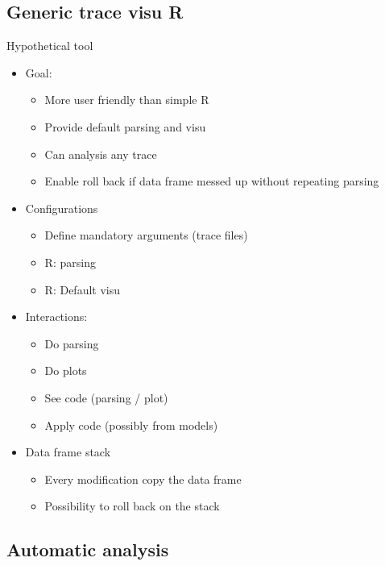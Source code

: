 \subsection{Generic trace visu R}

Hypothetical tool
\begin{itemize}
    \item Goal:
        \begin{itemize}
            \item More user friendly than simple R
            \item Provide default parsing and visu
            \item Can analysis any trace
            \item Enable roll back if data frame messed up without repeating parsing
        \end{itemize}
    \item Configurations
        \begin{itemize}
            \item Define mandatory arguments (trace files)
            \item R: parsing
            \item R: Default visu
        \end{itemize}
    \item Interactions:
        \begin{itemize}
            \item Do parsing
            \item Do plots
            \item See code (parsing / plot)
            \item Apply code (possibly from models)
        \end{itemize}
    \item Data frame stack
        \begin{itemize}
            \item Every modification copy the data frame
            \item Possibility to roll back on the stack
        \end{itemize}
\end{itemize}

\subsection{Automatic analysis}


